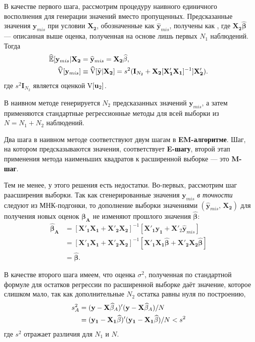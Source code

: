 В качестве первого шага, рассмотрим процедуру наивного единичного восполнения для генерации значений вместо пропущенных. Предсказанные значения $\mathbf{y}_{mis}$ при условии $\mathbf{X_2}$, обозначенные как $\widehat{\mathbf{y}}_{mis}$, получены как , где $\mathbf{X_2} \widehat{\mathbf{\beta}}$ --- описанная выше оценка, полученная на основе лишь первых $N_1$ наблюдений. Тогда
\begin{align}
\widehat{\mathbb{E}}[\mathbf{y}_{mis}|\mathbf{X_2}&=\widehat{\mathbf{y}}_{mis}=\mathbf{X_2} \widehat{\mathbf{\beta}}, \\
\widehat{\mathrm{V}}[\mathbf{y}_{mis}]&\equiv \widehat{\mathrm{V}}[\widehat{\mathbf{y}}|\mathbf{X_2}]=s^2(\mathbf{I}_{N_2}+\mathbf{X_2}[\mathbf{X'_1 X_1}]^{-1}]\mathbf{X'_2}). \notag
\end{align}
где $s^2\mathbf{I}_{N_2}$ является оценкой $\mathrm{V}[\mathbf{u}_2]$.

В наивном методе генерируется $N_2$ предсказанных значений $\mathbf{y}_{mis}$, а затем применяются стандартные регрессионные методы для всей выборки из $N=N_1+N_2$ наблюдений.

Два шага в наивном методе соответствуют двум шагам в {\bf EM-алгоритме}. Шаг, на котором предсказываются значения, соответствует {\bf E-шагу}, второй этап применения метода наименьших квадратов к расширенной выборке --- это {\bf M-шаг}.



Тем не менее, у этого решения есть недостатки. Во-первых, рассмотрим шаг раасширения выборки. Так как сгенерированные значения $\mathbf{y}_{mis}$ \emph{в точности} следуют из МНК-подгонки, то дополнение выборки значениями $(\widehat{\mathbf{y}}_{mis}, \, \mathbf{X_2})$ для получения новых оценок $\mathbf{\widehat{\beta}_A}$ не изменяют прошлого значения $\widehat{\mathbf{\beta}}$:
\begin{align*}
\mathbf{\widehat{\beta}_A}&= [\mathbf{X'_1 X_1}+\mathbf{X'_2 X_2}]^{-1}[\mathbf{X'_1 y_1}+\mathbf{X'}_2 \widehat{\mathbf{y}}_{mis}] \\
&=[\mathbf{X'_1 X_1}+\mathbf{X'_2 X_2}]^{-1}[\mathbf{X'_1 X_1}\widehat{\mathbf{\beta}}+\mathbf{X'_2 X_2}\widehat{\mathbf{\beta}}] \\
&= \widehat{\mathbf{\beta}}.
\end{align*}

В качестве второго шага имеем, что оценка $\sigma^2$, полученная по стандартной формуле для остатков регрессии по расширенной выборке даёт значение, которое слишком мало, так как дополнительные $N_2$ остатка равны нуля по построению,
\begin{align}
s^2_A &= (\mathbf{y-X}\widehat{\mathbf{\beta}}_A)'(\mathbf{y-X}\widehat{\mathbf{\beta}}_A)/N \\
&= (\mathbf{y_1-X_1}\widehat{\mathbf{\beta}})'(\mathbf{y_1-X_1}\widehat{\mathbf{\beta}})/N<s^2 \notag
\end{align}
где $s^2$ отражает различия для $N_1$ и $N$.

